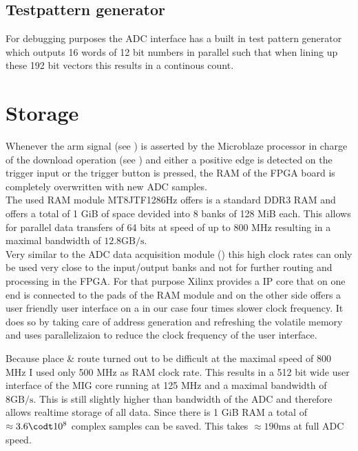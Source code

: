 \subsection{Testpattern generator}
For debugging purposes the \gls{ADC} interface has a built in test pattern
generator which outputs 16 words of 12 bit numbers in parallel such that
when lining up these 192 bit vectors this results in a continous count.

\section{Storage}
\label{sec:fpga_storage}
Whenever the arm signal (see ) is asserted
by the Microblaze processor in charge of the download operation
(see ) and either a positive edge is detected
on the trigger input or the trigger button is pressed,
the \gls{RAM} of the \gls{FPGA} board is completely overwritten with new
\gls{ADC} samples. \\

The used \gls{RAM} module MT8JTF1286Hz offers is a standard \gls{DDR3} \gls{RAM}
and offers a total of 1 GiB of space devided into 8 banks of 128 MiB each.
This allows for parallel data transfers of 64 bits at speed of up to 800 MHz
resulting in a maximal bandwidth of $12.8 \text{GB}/\text{s}$. \\

Very similar to the \gls{ADC} data acquisition module ()
this high clock rates can only be used very close to the input/output banks
and not for further routing and processing in the \gls{FPGA}.
For that purpose Xilinx provides a \gls{IP} core that on one end is connected
to the pads of the \gls{RAM} module and on the other side offers a user
friendly user interface on a in our case four times slower clock frequency.
It does so by taking care of address generation and refreshing the volatile
memory and uses parallelizaion to reduce the clock frequency of the user
interface. \\

Because place \& route turned out to be difficult at the maximal speed
of 800 MHz I used only 500 MHz as \gls{RAM} clock rate. This results
in a 512 bit wide user interface of the \gls{MIG} core running at 125 MHz
and a maximal bandwidth of $8 \text{GB}/\text{s}$. This is still slightly
higher than bandwidth of the \gls{ADC} and therefore allows realtime
storage of all data. Since there is 1 GiB \gls{RAM}
a total of $\approx 3.6 \codt 10^8$ complex samples can be saved. This
takes $\approx 190 \text{ms}$ at full \gls{ADC} speed. \\

